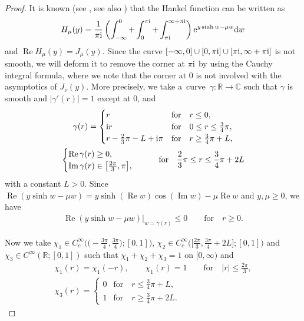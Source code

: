 \documentclass[10pt,a4paper]{amsart}
\numberwithin{equation}{section}
\def\R{\mathbb{R}}%
\DeclareMathOperator{\re}{Re}%
\DeclareMathOperator{\im}{Im}%
\def\c{\gamma}
\def\m{\mu}
\def\n{\nu}
\begin{document}
\begin{proof}
It is known (see \cite[Section~6.21\,(3)]{W}, see also \cite[equation~(9.7)]{IJ}) that the Hankel function can be written as
\begin{align}\label{Hankelint}
H_{\m}(y)=\frac{1}{\pi {\rm i}}\left(\int_{-\infty}^0+\int_0^{\pi {\rm i}}+\int_{\pi {\rm i}}^{\infty+\pi {\rm i}}\right){\rm e}^{y\sinh w-\m w}{\rm d}w
\end{align}
and $\re H_{\m}(y)=J_{\m}(y)$. Since the curve $[-\infty,0]\cup [0,\pi {\rm i}]\cup [\pi {\rm i},\infty+\pi {\rm i}]$ is not smooth, we will deform it to remove the corner at $\pi {\rm i}$ by using the Cauchy integral formula, where we note that the corner at $0$ is not involved with the asymptotics of $J_{\n}(y)$.
More precisely, we take a~curve~${\c\colon\R\to \mathbb{C}}$ such that $\c$ is smooth and $|\c'(r)|=1$ except at $0$, and
\begin{gather*}
\c(r)=\begin{cases}
r& \text{for}\quad r\leq 0,\\
 {\rm i}r& \text{for}\quad 0\leq r\leq \frac{3}{4}\pi,\\
r-\frac{2}{3}\pi-L+ {\rm i}\pi& \text{for}\quad r\geq \frac{3}{4}\pi+L,
\end{cases} \\
\begin{cases}\re \c(r)\geq 0,\\ \im \c(r)\in \bigl[\frac{2\pi}{3},\pi\bigr], \end{cases}\qquad \text{for}\quad \frac{2}{3}\pi\leq r\leq \frac{3}{4}\pi+2L
\end{gather*}
with a constant $L>0$. Since $\re (y\sinh w-\m w)=y\sinh(\re w)\cos(\im w)-\m \re w$ and $y,\m\geq 0$, we have
\begin{align}\label{Besphaseleq0}
\re (y\sinh w-\m w)|_{w=\c(r)}\leq 0\qquad \text{for}\quad r\geq 0.
\end{align}

Now we take $\chi_1\in C_c^{\infty}\bigl(\bigl(-\frac{3\pi}{4},\frac{3\pi}{4}\bigr);[0,1]\bigr)$, $\chi_2\in C_c^{\infty}\bigl(\bigl[\frac{2\pi}{3},\frac{3\pi}{4}+2L\bigr];[0,1]\bigr)$ and $\chi_3\in C^{\infty}(\R;[0,1])$ such that $\chi_1+\chi_2+\chi_3=1$ on $[0,\infty)$ and
\begin{gather*}
\chi_1(r)=\chi_1(-r),\qquad \chi_1(r)=1\qquad \text{for}\quad |r|\leq \frac{2\pi}{3},\\
 \chi_3(r)=\begin{cases}0& \text{for}\quad r\leq \frac{3}{4}\pi+L,\\ 1& \text{for}\quad r\geq \frac{3}{4}\pi+2L. \end{cases}
\end{gather*}


\end{proof}
\end{document}
